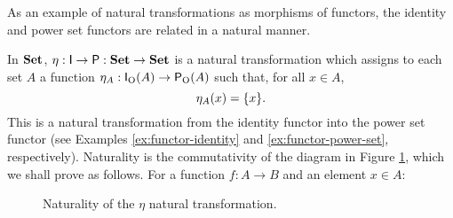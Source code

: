 As an example of natural transformations as morphisms of functors, the
identity and power set functors are related in a natural manner.

\begin{example}
  \label{ex:natural-identity-power-set}


  In $\mathbf{Set}$, $\eta: \mathsf{I} \to \mathsf{P}: \mathbf{Set} \to \mathbf{Set}$ is a
  natural transformation which assigns to each set $A$ a function
  $\eta_{A}: \mathsf{I}_{\operatorname{O}}(A) \to \mathsf{P}_{\operatorname{O}}(A)$ such that, for all
  $x \in A$,
  \begin{equation}
    \label{eq:eta}
    \eta_{A}(x) = \{x\}
    \text{.}
  \end{equation}
  This is a natural transformation from the identity functor into the
  power set functor (see Examples \ref{ex:functor-identity} and
  \ref{ex:functor-power-set}, respectively). Naturality is the
  commutativity of the diagram in Figure
  \ref{fig:natural-identity-power-set}, which we shall prove as
  follows. For a function $f: A \to B$ and an element $x \in A$:
  \begin{steps}
      \eqby{\eqref{eq:functor-identity-morphism}}
      \eqby{\eqref{eq:eta}}
  \end{steps}

  \begin{figure}[htb]
    \begin{center}
    \end{center}
    \caption{Naturality of the $\eta$ natural transformation.}
    \label{fig:natural-identity-power-set}
  \end{figure}

\end{example}

